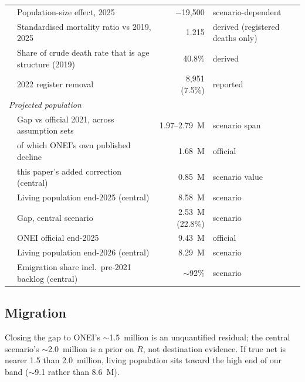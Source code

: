 \documentclass[11pt,a4paper]{article}
\begin{document}
\begin{table}[ht]
\begin{tabular}{llrl}
& Population-size effect, 2025 & $-$19{,}500 & scenario-dependent \\
& Standardised mortality ratio vs 2019, 2025 & 1.215 & derived (registered deaths only) \\
& Share of crude death rate that is age structure (2019) & 40.8\% & derived \\
& 2022 register removal & 8{,}951 (7.5\%) & reported \\
\midrule
\multicolumn{4}{l}{\textit{Projected population}} \\
& Gap vs official 2021, across assumption sets & 1.97--2.79~M & scenario span \\
& \quad of which ONEI's own published decline & 1.68~M & official \\
& \quad this paper's added correction (central) & 0.85~M & scenario value \\
& Living population end-2025 (central) & 8.58~M & scenario \\
& Gap, central scenario & 2.53~M (22.8\%) & scenario \\
& ONEI official end-2025 & 9.43~M & official \\
& Living population end-2026 (central) & 8.29~M & scenario \\
& Emigration share incl.\ pre-2021 backlog (central) & $\sim$92\% & scenario \\
\bottomrule
\end{tabular}
\end{table}

\subsection{Migration}


Closing the gap to ONEI's $\sim$1.5~million is an unquantified residual; the central scenario's $\sim$2.0~million is a prior on $R$, not destination evidence. If true net is nearer 1.5 than 2.0~million, living population sits toward the high end of our band ($\sim$9.1 rather than 8.6~M).
\end{document}
